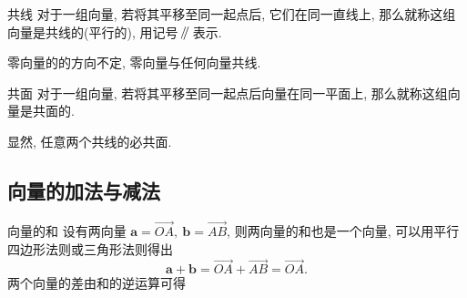 \documentclass[cn,toc=twocol]{elegantbook}
\newcommand{\ve}[1]{\boldsymbol{#1}}
\newcommand{\Ve}[1]{\overrightarrow{#1}}
\newcommand{\parallelsum}{\mathbin{\!/\mkern-5mu/\!}}
\begin{document}
\begin{definition}{共线}
	对于一组向量, 若将其平移至同一起点后, 它们在同一直线上, 那么就称这组向量是共线的(平行的), 用记号 $\parallelsum$ 表示.	
\end{definition}

零向量的的方向不定, 零向量与任何向量共线.

\begin{definition}{共面}
	对于一组向量, 若将其平移至同一起点后向量在同一平面上, 那么就称这组向量是共面的.
\end{definition}

显然, 任意两个共线的必共面.

\subsection{向量的加法与减法}

\begin{definition}{向量的和}
设有两向量 $\ve a = \Ve{OA} ,\ \ve b = \Ve{AB}$, 则两向量的和也是一个向量, 可以用平行四边形法则或三角形法则得出
\[
	\ve a + \ve b = \Ve{OA} + \Ve{AB} = \Ve{OA}.
\]
两个向量的差由和的逆运算可得

\end{definition}
\end{document}
